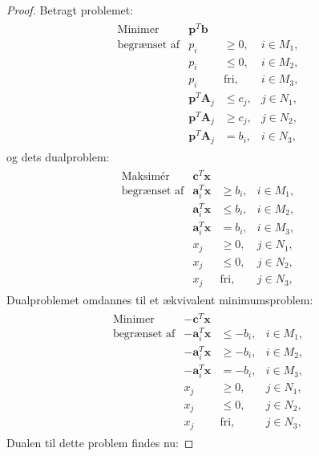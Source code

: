 \begin{proof}
Betragt problemet:
\begin{align*}
\begin{array}{lrll}
\text{Minimer}		&\textbf{p}^T\textbf{b}	&			&\\
\text{begrænset af}	&p_i					&\geq 0,	&i \in M_1,\\
					&p_i					&\leq 0,	&i \in M_2,\\
					&p_i					&\text{fri},	&i \in M_3,\\
					&\textbf{p}^T\textbf{A}_j	&\leq c_j,	&j \in N_1,\\
					&\textbf{p}^T\textbf{A}_j	&\geq c_j,	&j \in N_2,\\
					&\textbf{p}^T\textbf{A}_j	& = b_i,	&i \in N_3,
\end{array}
\end{align*}
og dets dualproblem:
\begin{align*}
\begin{array}{lrll}
\text{Maksimér}		&\textbf{c}^T\textbf{x}	&			&\\
\text{begrænset af}	&\textbf{a}_i^T\textbf{x}	&\geq b_i,	&i \in M_1,\\
					&\textbf{a}_i^T\textbf{x}	&\leq b_i,	&i \in M_2,\\
					&\textbf{a}_i^T\textbf{x}	& = b_i,	&i \in M_3,\\
					&x_j					&\geq 0,	&j \in N_1,\\
					&x_j					&\leq 0,	&j \in N_2,\\							&x_j					&\text{fri},	&j \in N_3,
\end{array}
\end{align*}
Dualproblemet omdannes til et ækvivalent minimumsproblem:
\begin{align*}
\begin{array}{lrll}
\text{Minimer}		&-\textbf{c}^T\textbf{x}	&			&\\
\text{begrænset af}	&-\textbf{a}_i^T\textbf{x}	&\leq -b_i,	&i \in M_1,\\
					&-\textbf{a}_i^T\textbf{x}	&\geq -b_i,	&i \in M_2,\\
					&-\textbf{a}_i^T\textbf{x}	& = -b_i,	&i \in M_3,\\
					&x_j					&\geq 0,	&j \in N_1,\\
					&x_j					&\leq 0,	&j \in N_2,\\							&x_j					&\text{fri},	&j \in N_3,
\end{array}
\end{align*}
Dualen til dette problem findes nu:

\end{proof}
